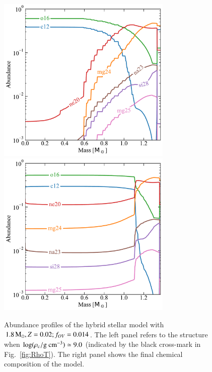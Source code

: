 \documentclass[main.tex]{subfiles}
\begin{document}
\begin{figure}[hbt!]
    \centering
    \includegraphics[height=8cm]{figures/chapter2/abundances/1p8_logRho9_abun.pdf}\quad
    \includegraphics[height=8cm]{figures/chapter2/abundances/1p8_final_abun.pdf}
    \caption{Abundance profiles of the \seriesone hybrid stellar model with $ 1.8\mathrm{\,M_\odot},  Z=0.02;f_{OV}=0.014$. The left panel refers to the structure when $\rm \log(\rho_c / g \ cm^{-3}) \simeq 9.0$ (indicated by the black cross-mark in Fig.~\ref{fig:RhoT}). The right panel shows the final chemical composition of the model.} 
\end{figure}
\end{document}
